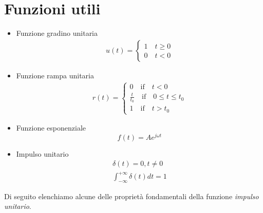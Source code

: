 \documentclass[a4paper, titlepage, oneside]{scrbook}
\begin{document}
\section{Funzioni utili}
\begin{itemize}
	\item Funzione gradino unitaria
	\begin{align*}
	u(t)=\left\{
		\begin{array}{ll}
		1 \quad t\geq0\\
		0 \quad t<0
		\end{array}
		\right.
	\end{align*}
	
	\item Funzione rampa unitaria
	\begin{align*}
	r(t)=\left\{
	\begin{array}{ll}
	0  \quad \text{if} \quad t<0\\
	\frac{t}{t_{0}} \quad  \text{if} \quad 0\leq t\leq t_{0}\\
	1 \quad \text{if} \quad t>t_{0}
	\end{array}
	\right.
	\end{align*}
	
	\item Funzione esponenziale
	$$f(t)=Ae^{j\omega t}$$
	
	\item Impulso unitario
	\begin{align*}
	\delta(t)=0,t\neq0\\
	\int_{-\infty}^{+\infty}\delta(t)dt=1
	\end{align*}
\end{itemize}
Di seguito elenchiamo alcune delle proprietà fondamentali della funzione \textit{impulso unitario}.
\end{document}
